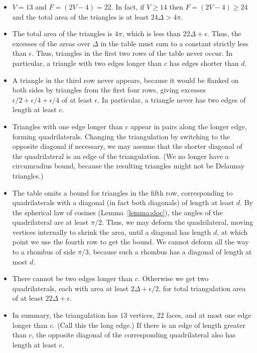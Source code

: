 \begin{itemize}
  \item $V=13$ and $F=(2V-4)=22$.  In fact, if $V\ge14$ then $F= (2V-4)\ge 24$ and
  the total area of the triangles is at least $24\Delta > 4\pi$.
  \item The total area of the triangles is $4\pi$, which is less than
  $22\Delta+\epsilon$.  Thus, the excesses of the areas over
  $\Delta$ in the table must sum to a constant strictly less than
  $\epsilon$.  Thus, triangles in the first two rows of the table
  never occur.  In particular, a triangle with two edges longer
  than $c$ has edges shorter than $d$.
  \item A triangle in the third row never appears, because it
  would be flanked on both sides by triangles from the first four rows,
  giving excesses $\epsilon/2 + \epsilon/4 + \epsilon/4$ of at
  least $\epsilon$. In particular, a triangle never has two edges
  of length at least $c$.
  \item Triangles with one edge longer than $c$ appear in pairs
  along the longer edge, forming quadrilaterals.  Changing the
  triangulation by switching to the opposite diagonal if
  necessary, we may assume that the shorter diagonal of the
  quadrilateral is an edge of the triangulation.  (We no longer
  have a circumradius bound, because the resulting triangles might not be Delaunay
  triangles.)
  \item The table omits a bound for triangles in the fifth row,
  corresponding to quadrilaterals with a diagonal (in fact both diagonals) of length at
  least $d$. By the spherical law of cosines (Lemma~\ref{lemma:sloc}), the angles of the quadrilateral are
  at least $\pi/2$.  Thus, we may deform the quadrilateral, moving
  vertices internally to shrink the area, until a diagonal has length $d$, at which
  point we use the fourth row to get the bound.  We cannot deform all the way
  to a
  rhombus of side $\pi/3$, because such a rhombus has a diagonal
  of length at most $d$.
  \item There cannot be two edges longer than $c$.  Otherwise we
  get two quadrilaterals, each with area at least $2\Delta +
  \epsilon/2$, for total triangulation area of at least $22\Delta
  + \epsilon$.
  \item In summary, the triangulation has $13$ vertices, $22$
  faces, and at most one edge longer than $c$.  (Call this the long edge.)
  If there is an
  edge of length greater than $c$, the opposite diagonal of the
  corresponding quadrilateral also has length at least $c$.
\end{itemize}



